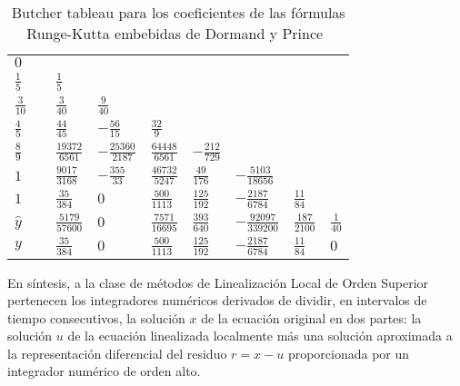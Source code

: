 \begin{table}[h]
	\caption{Butcher tableau para los coeficientes de las fórmulas Runge-Kutta embebidas de Dormand y Prince~\cite{hairer1993solving}} \label{ButcherTabla}
	\begin{center}
		\begin{tabular}{ l@{\vrule height 5pt depth 10pt width 0pt}|lllllll}
			$0$ & \\
			$\frac{1}{5}\quad$ & $\frac{1}{5}$ \\
			$\frac{3}{10}\quad$ & $\frac{3}{40}$ & $\frac{9}{40}$ \\
			$\frac{4}{5}\quad$ & $\frac{44}{45}$ & $-\frac{56}{15}$ & $\frac{32}{9}$ \\
			$\frac{8}{9}\quad$ & $\frac{19372}{6561}$ & $-\frac{25360}{2187}$ & $\frac{64448}{6561}$ & $-\frac{212}{729}$ \\
			$1\quad$ & $\frac{9017}{3168}$ & $-\frac{355}{33}$ & $\frac{46732}{5247}$ & $\frac{49}{176}$
			& $-\frac{5103}{18656}$ \\
			$1\quad$ & $\frac{35}{384}$ & $0$ & $\frac{500}{1113}$ & $\frac{125}{192}$
			& $-\frac{2187}{6784}$ & $\frac{11}{84}$ \\
			\hline
			$\widehat{y}$ & $\frac{5179}{57600}$ & $0$ & $\frac{7571}{16695}$ & $\frac{393}{640}$
			& $-\frac{92097}{339200}$ & $\frac{187}{2100}$ & $\frac{1}{40}$
			\rule[-0.3cm]{0cm}{0.8cm} \\
			$y$ & $\frac{35}{384}$ & $0$ & $\frac{500}{1113}$ & $\frac{125}{192}$
			& $-\frac{2187}{6784}$ & $\frac{11}{84}$ & $0$
		\end{tabular}
	\end{center}
\end{table}

En síntesis, a la clase de métodos de Linealización Local de Orden Superior pertenecen los integradores numéricos derivados de dividir, en intervalos de tiempo consecutivos, la solución $x$ de la ecuación original en dos partes: la solución $u$ de la ecuación linealizada localmente más una solución aproximada a la representación diferencial del residuo $r = x-u$ proporcionada por un integrador numérico de orden alto.

